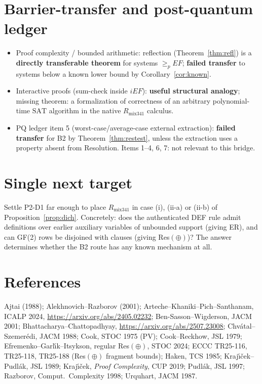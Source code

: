 \documentclass[11pt]{article}
\theoremstyle{remark}
\newcommand{\SAT}{\mathrm{SAT}}
\begin{document}
\section{Barrier-transfer and post-quantum ledger}
\begin{itemize}
\item Proof complexity / bounded arithmetic: reflection (Theorem~\ref{thm:refl}) is a
\textbf{directly transferable theorem} for systems $\ge_p EF$; \textbf{failed transfer} to systems
below a known lower bound by Corollary~\ref{cor:known}.
\item Interactive proofs (sum-check inside $iEF$): \textbf{useful structural analogy}; missing
theorem: a formalization of correctness of an arbitrary polynomial-time $\SAT$ algorithm in the
native $R_{\mathrm{mix341}}$ calculus.
\item PQ ledger item 5 (worst-case/average-case external extraction): \textbf{failed transfer} for
B2 by Theorem~\ref{thm:restest}, unless the extraction uses a property absent from Resolution.
Items 1--4, 6, 7: not relevant to this bridge.
\end{itemize}

\section{Single next target}
Settle P2-D1 far enough to place $R_{\mathrm{mix341}}$ in case (i), (ii-a) or (ii-b) of
Proposition~\ref{prop:dich}. Concretely: does the authenticated DEF rule admit definitions over
earlier auxiliary variables of unbounded support (giving ER), and can GF(2) rows be disjoined with
clauses (giving Res$(\oplus)$)? The answer determines whether the B2 route has any known mechanism
at all.

\section*{References}
Ajtai (1988); Alekhnovich--Razborov (2001); Arteche--Khaniki--Pich--Santhanam, ICALP 2024,
\url{https://arxiv.org/abs/2405.02232}; Ben-Sasson--Wigderson, JACM 2001;
Bhattacharya--Chattopadhyay, \url{https://arxiv.org/abs/2507.23008}; Chv\'atal--Szemer\'edi, JACM 1988;
Cook, STOC 1975 (PV); Cook--Reckhow, JSL 1979; Efremenko--Garl\'{\i}k--Itsykson, regular Res$(\oplus)$,
STOC 2024; ECCC TR25-116, TR25-118, TR25-188 (Res$(\oplus)$ fragment bounds); Haken, TCS 1985;
Kraj\'{\i}\v{c}ek--Pudl\'ak, JSL 1989; Kraj\'{\i}\v{c}ek, \emph{Proof Complexity}, CUP 2019;
Pudl\'ak, JSL 1997; Razborov, Comput.\ Complexity 1998; Urquhart, JACM 1987.
\end{document}
